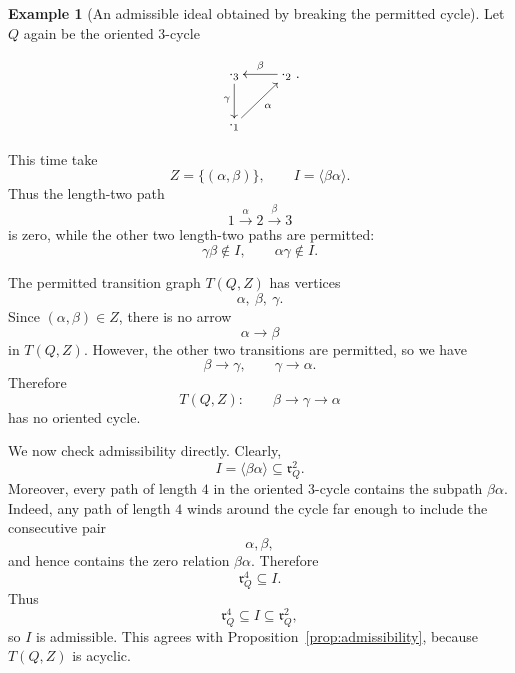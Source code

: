 \documentclass[11pt]{article}
\newcommand{\rad}{\mathfrak r}
\theoremstyle{plain}
\theoremstyle{definition}
\newtheorem{example}[theorem]{Example}
\theoremstyle{remark}
\begin{document}
\begin{example}[An admissible ideal obtained by breaking the permitted cycle]
Let \(Q\) again be the oriented \(3\)-cycle

\begin{equation}\label{}
\nonumber \xymatrix{
\cdot_{3} \ar[d]_{\gamma} & \ar[l]_{\beta}\cdot_{2} \\
	\cdot_{1}  \ar[ur]_{\alpha}}.
  \end{equation}
  
This time take
\[
Z=\{(\alpha,\beta)\},
\qquad
I=\langle \beta\alpha\rangle.
\]
Thus the length-two path
\[
1\xrightarrow{\alpha}2\xrightarrow{\beta}3
\]
is zero, while the other two length-two paths are permitted:
\[
\gamma\beta\notin I,
\qquad
\alpha\gamma\notin I.
\]

The permitted transition graph \(T(Q,Z)\) has vertices
\[
\alpha,\ \beta,\ \gamma.
\]
Since \((\alpha,\beta)\in Z\), there is no arrow
\[
\alpha\longrightarrow \beta
\]
in \(T(Q,Z)\). However, the other two transitions are permitted, so we have
\[
\beta\longrightarrow \gamma,
\qquad
\gamma\longrightarrow \alpha.
\]
Therefore
\[
T(Q,Z):
\qquad
\beta\longrightarrow \gamma\longrightarrow \alpha
\]
has no oriented cycle.

We now check admissibility directly. Clearly,
\[
I=\langle \beta\alpha\rangle\subseteq \rad_Q^2.
\]
Moreover, every path of length \(4\) in the oriented \(3\)-cycle contains the
subpath \(\beta\alpha\). Indeed, any path of length \(4\) winds around the
cycle far enough to include the consecutive pair
\[
\alpha,\beta,
\]
and hence contains the zero relation \(\beta\alpha\). Therefore
\[
\rad_Q^4\subseteq I.
\]
Thus
\[
\rad_Q^4\subseteq I\subseteq \rad_Q^2,
\]
so \(I\) is admissible. This agrees with Proposition~\ref{prop:admissibility},
because \(T(Q,Z)\) is acyclic.
\end{example}
\end{document}
